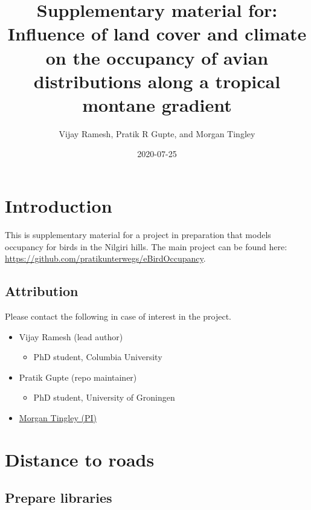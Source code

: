 \documentclass[]{article}
\title{Supplementary material for: Influence of land cover and climate on the occupancy of avian distributions along a tropical montane gradient}
\author{Vijay Ramesh, Pratik R Gupte, and Morgan Tingley}
\date{2020-07-25}
\providecommand{\tightlist}{%
  \setlength{\itemsep}{0pt}\setlength{\parskip}{0pt}}
\begin{document}
\maketitle


\linenumbers

{
\setcounter{tocdepth}{2}
\tableofcontents
}
\hypertarget{introduction}{%
\section{Introduction}\label{introduction}}

This is supplementary material for a project in preparation that models occupancy for birds in the Nilgiri hills. The main project can be found here: \url{https://github.com/pratikunterwegs/eBirdOccupancy}.

\hypertarget{attribution}{%
\subsection{Attribution}\label{attribution}}

Please contact the following in case of interest in the project.

\begin{itemize}
\tightlist
\item
  Vijay Ramesh (lead author)

  \begin{itemize}
  \tightlist
  \item
    PhD student, Columbia University
  \end{itemize}
\item
  Pratik Gupte (repo maintainer)

  \begin{itemize}
  \tightlist
  \item
    PhD student, University of Groningen
  \end{itemize}
\item
  \href{https://www.morgantingley.com}{Morgan Tingley (PI)}
\end{itemize}

\hypertarget{distance-to-roads}{%
\section{Distance to roads}\label{distance-to-roads}}

\hypertarget{prepare-libraries}{%
\subsection{Prepare libraries}\label{prepare-libraries}}
\end{document}

